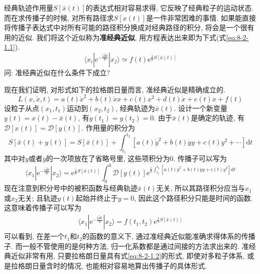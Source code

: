         经典轨迹作用量$S[\bar x(t)]$的表达式相对容易求得, 它反映了经典粒子的运动状态. 而在求传播子的时候, 对所有路径求$S[x(t)]$是一件非常困难的事情. 如果能直接将传播子表达式中对所有可能的路径积分换成对经典路径的积分, 将会是一个很有用的近似. 我们将这个近似称为\textbf{准经典近似}, 用方程表达出来即为下式(式\ref{eq:8-2-1.1}). 
        \begin{equation}\label{eq:8-2-1.1}
            \langle x_i | \mathrm{e}^{-\frac {\mathrm{i}\hat{H}t}{\hslash}} | x_f \rangle \simeq f(t) \mathrm{e}^{ \frac{\mathrm{i}}{\hslash} S[\bar x(t)] } 
        \end{equation}
        问: 准经典近似在什么条件下成立?

        \splitline

        现在我们证明, 对形式如下的拉格朗日量而言, 准经典近似是精确成立的. 
        \begin{equation}\label{eq:8-2-1.2}
            L(x, \dot x, t) = a(t)\dot x^2 + b(t) \dot x x + c(t) x^2 + d(t) \dot x + e(t) x + f(t)
        \end{equation}
        设粒子从点$(x_1, t_1)$运动到$(x_2, t_2)$, 经典轨迹为$\bar x(t)$. 设计一个新变量$y(t) = x(t) - \bar x(t)$, 有$y(t_1) = y(t_2) = 0$. 由于$\bar x(t)$是确定的轨迹, 有$\mathcal{D}[x(t)] = \mathcal{D}[y(t)]$. 作用量的积分为
        \begin{equation}
            S[\bar x(t) + y(t)] = S[\bar x(t)] + \int_{t_1}^{t_2} [a(t)\dot y^2 + b(t) \dot y y + c(t) y^2 + \cdots] \mathrm{d}t
        \end{equation}
        其中对$y$或者$\dot y$的一次项放在了省略号里, 这些项积分为0. 传播子可以写为
        \begin{equation}
            \langle x_1 | \mathrm{e}^{-\frac {\mathrm{i}\hat{H}t}{\hslash}} | x_2 \rangle = \mathrm{e}^{ \frac{\mathrm{i}}{\hslash} S[\bar x(t)] } \int_0^0 \mathcal{D}[y(t)] \mathrm{e}^{ \frac{\mathrm{i}}{\hslash} \int_{t_1}^{t_2} [a(t)\dot y^2 + b(t) \dot y y + c(t) y^2] \mathrm{d}t }
        \end{equation}
        现在注意到积分号中的被积函数与经典轨迹$\bar x(t)$无关, 所以其路径积分应当与$x_1$或$x_2$无关; 且轨迹$y(t)$起始并终止于$y=0$, 因此这个路径积分只能是时间的函数. 这意味着传播子可以写为
        \begin{equation}\begin{aligned}
            \langle x_1 | \mathrm{e}^{-\frac {\mathrm{i}\hat{H}t}{\hslash}} | x_2 \rangle = f(t_1, t_2) \mathrm{e}^{ \frac{\mathrm{i}}{\hslash} S[\bar x(t)] } 
        \end{aligned}\end{equation}
        可以看到, 在差一个$t_1$和$t_2$的函数的意义下, 通过准经典近似能准确求得体系的传播子. 而一般不管使用的是何种方法, 归一化系数都是通过间接的方法求出来的. 准经典近似非常有用, 只要拉格朗日量具有式\ref{eq:8-2-1.2}的形式, 即使对多粒子体系, 或是拉格朗日量含时的情况, 也能相对容易地算出传播子的具体形式. 

